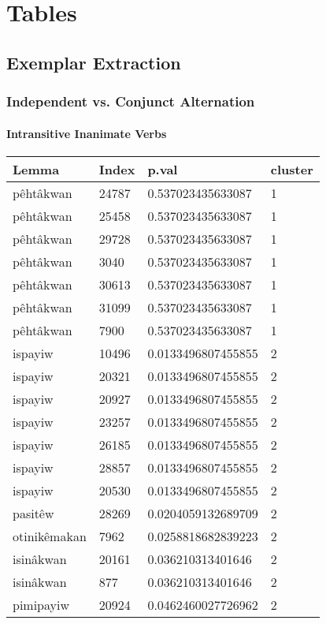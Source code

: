\chapter{Tables}
\section{Exemplar Extraction}
\subsection{Independent vs. Conjunct Alternation}
\subsubsection{Intransitive Inanimate Verbs}



\begin{longtable}{llll}
\toprule
Lemma & Index & p.val & cluster \\
\midrule
pêhtâkwan & 24787 & 0.537023435633087 & 1 \\
pêhtâkwan & 25458 & 0.537023435633087 & 1 \\
pêhtâkwan & 29728 & 0.537023435633087 & 1 \\
pêhtâkwan & 3040 & 0.537023435633087 & 1 \\
pêhtâkwan & 30613 & 0.537023435633087 & 1 \\
pêhtâkwan & 31099 & 0.537023435633087 & 1 \\
pêhtâkwan & 7900 & 0.537023435633087 & 1 \\
ispayiw & 10496 & 0.0133496807455855 & 2 \\
ispayiw & 20321 & 0.0133496807455855 & 2 \\
ispayiw & 20927 & 0.0133496807455855 & 2 \\
ispayiw & 23257 & 0.0133496807455855 & 2 \\
ispayiw & 26185 & 0.0133496807455855 & 2 \\
ispayiw & 28857 & 0.0133496807455855 & 2 \\
ispayiw & 20530 & 0.0133496807455855 & 2 \\
pasitêw & 28269 & 0.0204059132689709 & 2 \\
otinikêmakan & 7962 & 0.0258818682839223 & 2 \\
isinâkwan & 20161 & 0.036210313401646 & 2 \\
isinâkwan & 877 & 0.036210313401646 & 2 \\
pimipayiw & 20924 & 0.0462460027726962 & 2 \\

\end{longtable}
